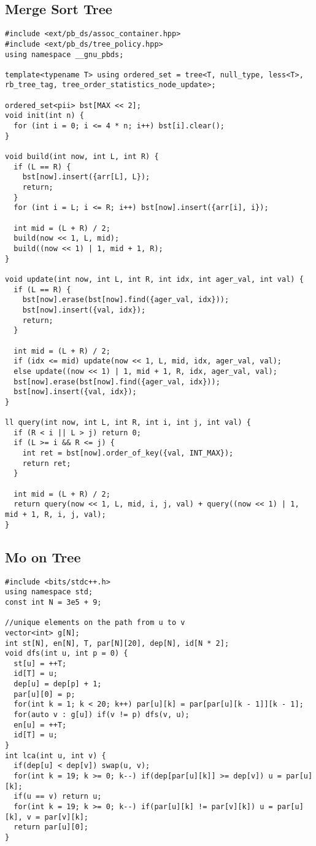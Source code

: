 \documentclass[10pt,a4paper,onesided]{article}
\begin{document}
\begin{multicols*}{3}
\subsection{Merge Sort Tree}
\begin{lstlisting}
#include <ext/pb_ds/assoc_container.hpp>
#include <ext/pb_ds/tree_policy.hpp>
using namespace __gnu_pbds;

template<typename T> using ordered_set = tree<T, null_type, less<T>, rb_tree_tag, tree_order_statistics_node_update>;

ordered_set<pii> bst[MAX << 2];
void init(int n) {
  for (int i = 0; i <= 4 * n; i++) bst[i].clear();
}

void build(int now, int L, int R) {
  if (L == R) {
    bst[now].insert({arr[L], L});
    return;
  }
  for (int i = L; i <= R; i++) bst[now].insert({arr[i], i});

  int mid = (L + R) / 2;
  build(now << 1, L, mid);
  build((now << 1) | 1, mid + 1, R);
}

void update(int now, int L, int R, int idx, int ager_val, int val) {
  if (L == R) {
    bst[now].erase(bst[now].find({ager_val, idx}));
    bst[now].insert({val, idx});
    return;
  }

  int mid = (L + R) / 2;
  if (idx <= mid) update(now << 1, L, mid, idx, ager_val, val);
  else update((now << 1) | 1, mid + 1, R, idx, ager_val, val);
  bst[now].erase(bst[now].find({ager_val, idx}));
  bst[now].insert({val, idx});
}

ll query(int now, int L, int R, int i, int j, int val) {
  if (R < i || L > j) return 0;
  if (L >= i && R <= j) {
    int ret = bst[now].order_of_key({val, INT_MAX});
    return ret;
  }

  int mid = (L + R) / 2;
  return query(now << 1, L, mid, i, j, val) + query((now << 1) | 1, mid + 1, R, i, j, val);
}

\end{lstlisting}
\subsection{Mo on Tree}
\begin{lstlisting}
#include <bits/stdc++.h>
using namespace std;
const int N = 3e5 + 9;

//unique elements on the path from u to v
vector<int> g[N];
int st[N], en[N], T, par[N][20], dep[N], id[N * 2];
void dfs(int u, int p = 0) {
  st[u] = ++T;
  id[T] = u;
  dep[u] = dep[p] + 1;
  par[u][0] = p;
  for(int k = 1; k < 20; k++) par[u][k] = par[par[u][k - 1]][k - 1];
  for(auto v : g[u]) if(v != p) dfs(v, u);
  en[u] = ++T;
  id[T] = u;
}
int lca(int u, int v) {
  if(dep[u] < dep[v]) swap(u, v);
  for(int k = 19; k >= 0; k--) if(dep[par[u][k]] >= dep[v]) u = par[u][k];
  if(u == v) return u;
  for(int k = 19; k >= 0; k--) if(par[u][k] != par[v][k]) u = par[u][k], v = par[v][k];
  return par[u][0];
}


\end{lstlisting}
\end{multicols*}
\end{document}
